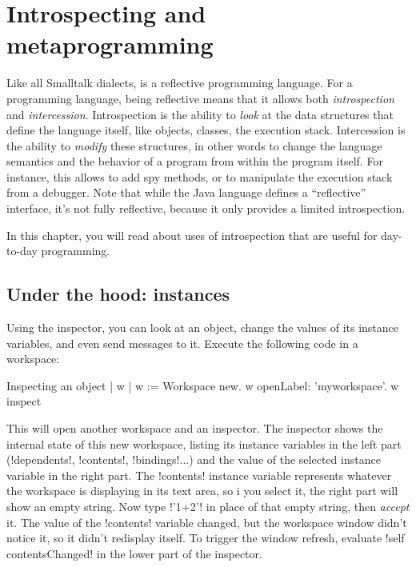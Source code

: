 \documentclass[a4paper,10pt,twoside]{book}
\begin{document}
	\renewcommand{\nnbb}[2]{} %
	\sloppy
\fi
\chapter{Introspecting and metaprogramming}\label{cha:metaprog}

Like all Smalltalk dialects, \sq is a reflective programming language.
For a programming language, being reflective means that it allows both \emph{introspection} and \emph{intercession}.
Introspection is the ability to \emph{look} at the data structures that define the language itself, like objects, classes, the execution stack.
Intercession is the ability to \emph{modify} these structures, in other words to change the language semantics and the behavior of a program from within the program itself.
For instance, this allows to  add spy methods, or to manipulate the execution stack from a debugger.
Note that while the Java language defines a ``reflective'' interface, it's not fully reflective, because it only provides a limited introspection. 

In this chapter, you will read about uses of introspection that are useful for day-to-day programming.


\section{Under the hood: instances} %

Using the inspector, you can look at an object, change the values of its instance variables, and even send messages to it. Execute the following code in a workspace:
\begin{script}[inspectobject]{Inspecting an object}
| w |
w := Workspace new.
w openLabel: 'myworkspace'.
w inspect
\end{script}

This will open another workspace and an inspector.
The inspector shows the internal state of this new workspace, listing its instance variables in the left part (\ct!dependents!, \ct!contents!, \ct!bindings!...) and the value of the selected instance variable in the right part.
The \ct!contents! instance variable represents whatever the workspace is displaying in its text area, so i you select it, the right part will show an empty string.
Now type \ct!'1+2'! in place of that empty string, then \emph{accept} it.
The value of the \ct!contents! variable changed, but the workspace window didn't notice it, so it didn't redisplay itself.
To trigger the window refresh, evaluate \ct!self contentsChanged! in the lower part of the inspector. 
\end{document}
